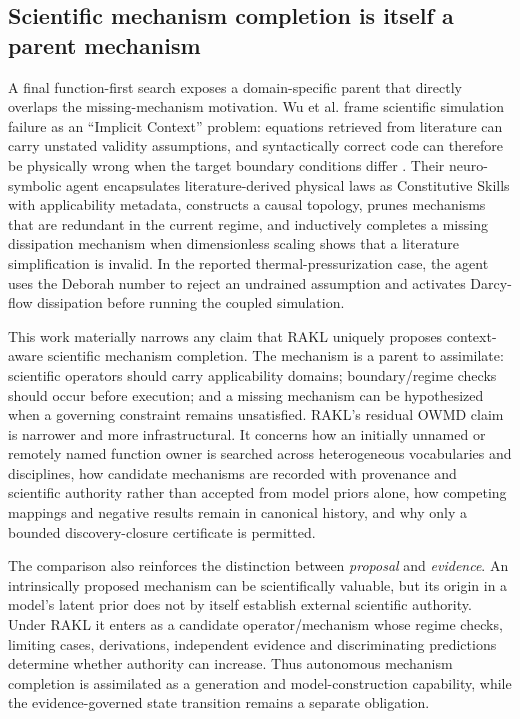 \subsection{Scientific mechanism completion is itself a parent mechanism}

A final function-first search exposes a domain-specific parent that directly overlaps the missing-mechanism motivation. Wu et al. frame scientific simulation failure as an ``Implicit Context'' problem: equations retrieved from literature can carry unstated validity assumptions, and syntactically correct code can therefore be physically wrong when the target boundary conditions differ \cite{wu2026epistemicclosure}. Their neuro-symbolic agent encapsulates literature-derived physical laws as Constitutive Skills with applicability metadata, constructs a causal topology, prunes mechanisms that are redundant in the current regime, and inductively completes a missing dissipation mechanism when dimensionless scaling shows that a literature simplification is invalid. In the reported thermal-pressurization case, the agent uses the Deborah number to reject an undrained assumption and activates Darcy-flow dissipation before running the coupled simulation.

This work materially narrows any claim that RAKL uniquely proposes context-aware scientific mechanism completion. The mechanism is a parent to assimilate: scientific operators should carry applicability domains; boundary/regime checks should occur before execution; and a missing mechanism can be hypothesized when a governing constraint remains unsatisfied. RAKL's residual OWMD claim is narrower and more infrastructural. It concerns how an initially unnamed or remotely named function owner is searched across heterogeneous vocabularies and disciplines, how candidate mechanisms are recorded with provenance and scientific authority rather than accepted from model priors alone, how competing mappings and negative results remain in canonical history, and why only a bounded discovery-closure certificate is permitted.

The comparison also reinforces the distinction between \emph{proposal} and \emph{evidence}. An intrinsically proposed mechanism can be scientifically valuable, but its origin in a model's latent prior does not by itself establish external scientific authority. Under RAKL it enters as a candidate operator/mechanism whose regime checks, limiting cases, derivations, independent evidence and discriminating predictions determine whether authority can increase. Thus autonomous mechanism completion is assimilated as a generation and model-construction capability, while the evidence-governed state transition remains a separate obligation.
